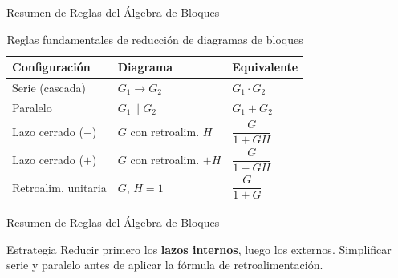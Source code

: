 \documentclass[aspectratio=169,xcolor=dvipsnames]{beamer}
\begin{document}
\begin{frame}{Resumen de Reglas del \'Algebra de Bloques}
    \begin{table}
        \centering
        \begin{tabular}{lll}
            \toprule
            \textbf{Configuraci\'on} & \textbf{Diagrama} & \textbf{Equivalente} \\
            \midrule
            Serie (cascada)       & $G_1 \rightarrow G_2$           & $G_1 \cdot G_2$ \\[0.3em]
            Paralelo              & $G_1 \parallel G_2$             & $G_1 + G_2$ \\[0.3em]
            Lazo cerrado ($-$)    & $G$ con retroalim. $H$          & $\dfrac{G}{1+GH}$ \\[0.5em]
            Lazo cerrado ($+$)    & $G$ con retroalim. $+H$         & $\dfrac{G}{1-GH}$ \\[0.5em]
            Retroalim. unitaria   & $G$, $H=1$                      & $\dfrac{G}{1+G}$ \\
            \bottomrule
        \end{tabular}
        \caption{Reglas fundamentales de reducci\'on de diagramas de bloques}
    \end{table}

\end{frame}
\begin{frame}{Resumen de Reglas del \'Algebra de Bloques}
\begin{alertblock}{Estrategia}
        Reducir primero los \textbf{lazos internos}, luego los externos. Simplificar serie y paralelo antes de aplicar la f\'ormula de retroalimentaci\'on.
    \end{alertblock}
\end{frame}
\end{document}
